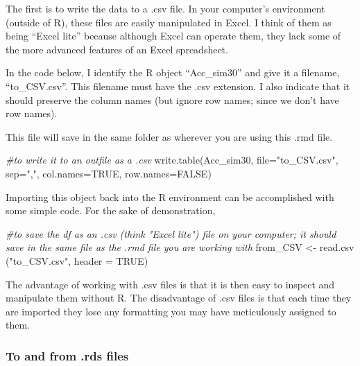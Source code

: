 \documentclass[
  english,
]{book}
\newenvironment{Shaded}{\begin{snugshade}}{\end{snugshade}}
\newcommand{\AttributeTok}[1]{\textcolor[rgb]{0.77,0.63,0.00}{#1}}
\newcommand{\CommentTok}[1]{\textcolor[rgb]{0.56,0.35,0.01}{\textit{#1}}}
\newcommand{\ConstantTok}[1]{\textcolor[rgb]{0.00,0.00,0.00}{#1}}
\newcommand{\FunctionTok}[1]{\textcolor[rgb]{0.00,0.00,0.00}{#1}}
\newcommand{\NormalTok}[1]{#1}
\newcommand{\OtherTok}[1]{\textcolor[rgb]{0.56,0.35,0.01}{#1}}
\newcommand{\StringTok}[1]{\textcolor[rgb]{0.31,0.60,0.02}{#1}}
\begin{document}
The first is to write the data to a .csv file. In your computer's environment (outside of R), these files are easily manipulated in Excel. I think of them as being ``Excel lite'' because although Excel can operate them, they lack some of the more advanced features of an Excel spreadsheet.

In the code below, I identify the R object ``Acc\_sim30'' and give it a filename, ``to\_CSV.csv''. This filename must have the .csv extension. I also indicate that it should preserve the column names (but ignore row names; since we don't have row names).

This file will save in the same folder as wherever you are using this .rmd file.

\begin{Shaded}
\begin{Highlighting}[]
\CommentTok{\#to write it to an outfile as a .csv}
\FunctionTok{write.table}\NormalTok{(Acc\_sim30, }\AttributeTok{file=}\StringTok{"to\_CSV.csv"}\NormalTok{, }\AttributeTok{sep=}\StringTok{","}\NormalTok{, }\AttributeTok{col.names=}\ConstantTok{TRUE}\NormalTok{, }\AttributeTok{row.names=}\ConstantTok{FALSE}\NormalTok{)}
\end{Highlighting}
\end{Shaded}

Importing this object back into the R environment can be accomplished with some simple code. For the sake of demonstration,

\begin{Shaded}
\begin{Highlighting}[]
\CommentTok{\#to save the df as an .csv (think "Excel lite") file on your computer; it should save in the same file as the .rmd file you are working with}
\NormalTok{from\_CSV }\OtherTok{\textless{}{-}} \FunctionTok{read.csv}\NormalTok{ (}\StringTok{"to\_CSV.csv"}\NormalTok{, }\AttributeTok{header =} \ConstantTok{TRUE}\NormalTok{)}
\end{Highlighting}
\end{Shaded}

The advantage of working with .csv files is that it is then easy to inspect and manipulate them without R. The disadvantage of .csv files is that each time they are imported they lose any formatting you may have meticulously assigned to them.

\hypertarget{to-and-from-.rds-files}{%
\subsubsection{To and from .rds files}\label{to-and-from-.rds-files}}
\end{document}
